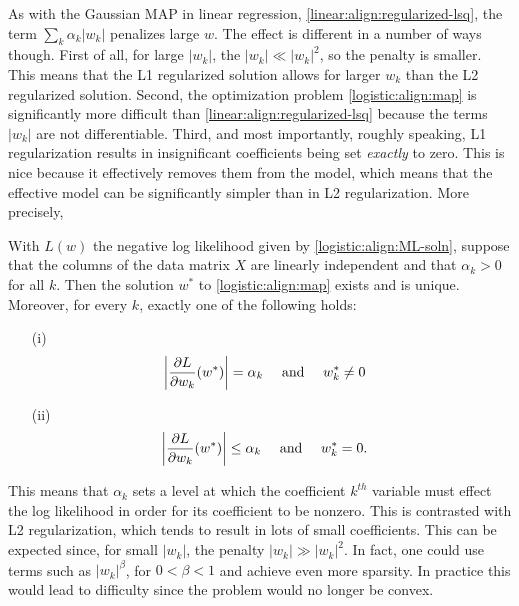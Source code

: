 As with the Gaussian MAP in linear regression, \eqref{linear:align:regularized-lsq}, the term $\sum_k\alpha_k|w_k|$ penalizes large $w$.  The effect is different in a number of ways though.  First of all, for large $|w_k|$, the $|w_k|\ll|w_k|^2$, so the penalty is smaller.  This means that the L1 regularized solution allows for larger $w_k$ than the L2 regularized solution.  Second, the optimization problem \eqref{logistic:align:map} is significantly more difficult than \eqref{linear:align:regularized-lsq} because the terms $|w_k|$ are not differentiable.  Third, and most importantly, roughly speaking, L1 regularization results in insignificant coefficients being set \emph{exactly} to zero.  This is nice because it effectively removes them from the model, which means that the effective model can be significantly simpler than in L2 regularization.  More precisely,
\begin{theorem}
  \label{logistic:theorem:L1-selection}
  With $L(w)$ the negative log likelihood given by \eqref{logistic:align:ML-soln}, suppose that the columns of the data matrix $X$ are linearly independent and that $\alpha_k>0$ for all $k$.  Then the solution $w^\ast$ to \eqref{logistic:align:map} exists and is unique.  Moreover, for every $k$, exactly one of the following holds:
  \begin{enumerate}
    \item[(i)] 
      \begin{align*}
        \left|\frac{\partial L}{\partial w_k}(w^\ast)\right| &= \alpha_k \quad\mbox{ and }\quad w^\ast_k\neq0
      \end{align*}
    \item[(ii)]
      \begin{align*}
        \left|\frac{\partial L}{\partial w_k}(w^\ast)\right| &\leq \alpha_k \quad\mbox{ and }\quad w^\ast_k=0.
      \end{align*}
  \end{enumerate}
\end{theorem}
\begin{remark}
  This means that $\alpha_k$ sets a level at which the coefficient $k^{th}$ variable must effect the log likelihood in order for its coefficient to be nonzero.  This is contrasted with L2 regularization, which tends to result in lots of small coefficients.  This can be expected since, for small $|w_k|$, the penalty $|w_k|\gg|w_k|^2$.  In fact, one could use terms such as $|w_k|^\beta$, for $0<\beta<1$ and achieve even more sparsity.  In practice this would lead to difficulty since the problem would no longer be convex.
\end{remark}
